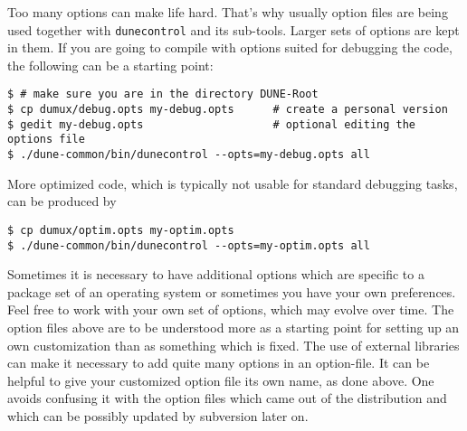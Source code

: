 Too many options can make life hard. That's why usually option files are being used together with \texttt{dunecontrol} and its sub-tools.
Larger sets of options are kept in them. If you are going to compile with options suited for debugging the code, the following
can be a starting point:
\begin{lstlisting}[style=Bash]
$ # make sure you are in the directory DUNE-Root
$ cp dumux/debug.opts my-debug.opts      # create a personal version
$ gedit my-debug.opts                    # optional editing the options file 
$ ./dune-common/bin/dunecontrol --opts=my-debug.opts all 
\end{lstlisting}

More optimized code, which is typically not usable for standard debugging tasks, can be produced by 
\begin{lstlisting}[style=Bash]
$ cp dumux/optim.opts my-optim.opts 
$ ./dune-common/bin/dunecontrol --opts=my-optim.opts all
\end{lstlisting}

Sometimes it is necessary to have additional options which
are specific to a package set of an operating system or
sometimes you have your own preferences.
Feel free to work with your own set of options, which may evolve over time.
The option files above are to be understood more as a starting point
for setting up an own customization than as something which is fixed.
The use of external libraries can make it necessary to add quite many options in an option-file.
It can be helpful to give your customized option file its own name, as done above.
One avoids confusing it with the option files which came out of the distribution
and which can be possibly updated by subversion later on.

